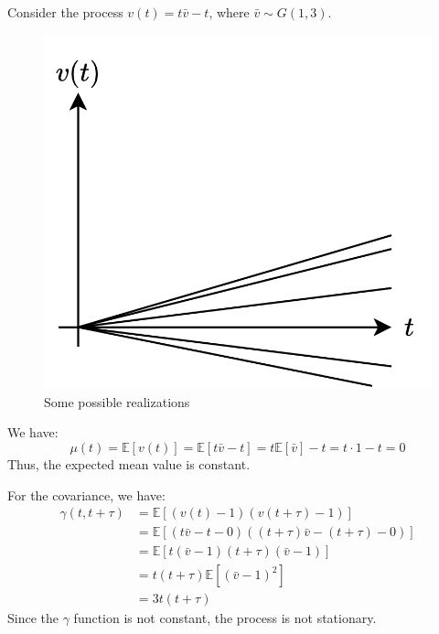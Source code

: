\begin{example}
    Consider the process $v(t)=t\bar{v}-t$, where $\bar{v} \sim G(1,3)$. 
    \begin{figure}[H]
        \centering
        \includegraphics[width=0.25\linewidth]{images/stationary.png}
        \caption{Some possible realizations}
    \end{figure}
    We have:
    \[\mu(t)=\mathbb{E}\left[v(t)\right]=\mathbb{E}\left[t\bar{v}-t\right]=t\mathbb{E}\left[\bar{v}\right]-t=t\cdot 1-t=0\]
    Thus, the expected mean value is constant.

    For the covariance, we have:
    \begin{align*}
        \gamma(t,t+\tau)&=\mathbb{E}\left[\left(v(t)-1\right)\left(v(t+\tau)-1\right)\right] \\
                        &=\mathbb{E}\left[\left(t\bar{v}-t-0\right)\left(\left(t+\tau\right)\bar{v}-\left(t+\tau\right)-0\right)\right] \\
                        &=\mathbb{E}\left[t\left(\bar{v}-1\right)\left(t+\tau\right)\left(\bar{v}-1\right)\right] \\
                        &=t\left(t+\tau\right)\mathbb{E}\left[\left(\bar{v}-1\right)^2\right] \\
                        &=3t\left(t+\tau\right)
    \end{align*}
    Since the $\gamma$ function is not constant, the process is not stationary.
\end{example}

